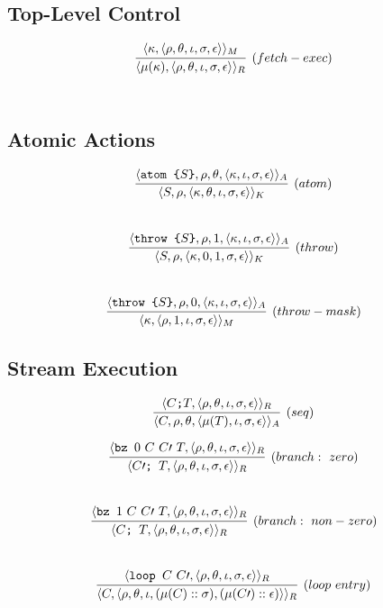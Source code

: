 \documentclass{article}
\newcommand{\state}[1]{\langle #1 \rangle}
\begin{document}
\subsection{Top-Level Control}
\[
  \infer[(fetch-exec)]{\state{\mu(\kappa), \state{\rho, \theta, \iota, \sigma, \epsilon}}_R}{\state{\kappa, \state{\rho, \theta, \iota, \sigma, \epsilon}}_M}
\]
\\

\subsection{Atomic Actions}

\[
  \infer[(atom)]{\state{S, \rho, \state{\kappa, \theta, \iota, \sigma, \epsilon}}_K}{\state{\texttt{atom \{}S\texttt{\}}, \rho, \theta, \state{\kappa, \iota, \sigma, \epsilon}}_A}
\]
\\

\[
  \infer[(throw)]{\state{S, \rho, \state{\kappa, 0, 1, \sigma, \epsilon}}_K}{\state{\texttt{throw \{}S\texttt{\}}, \rho, 1, \state{\kappa, \iota, \sigma, \epsilon}}_A}
\]
\\

\[
  \infer[(throw-mask)]{\state{\kappa, \state{\rho, 1, \iota, \sigma, \epsilon}}_M}{\state{\texttt{throw \{}S\texttt{\}}, \rho, 0, \state{\kappa, \iota, \sigma, \epsilon}}_A}
\]

\subsection{Stream Execution}
\[
  \infer[(seq)]{\state{C, \rho, \theta, \state{\mu(T), \iota, \sigma, \epsilon}}_A}{\state{C\texttt{;}T, \state{\rho, \theta, \iota, \sigma, \epsilon}}_R}
\]

\[
  \infer[(branch:\ zero)]{\state{C\prime\texttt{; }T, \state{\rho, \theta, \iota, \sigma, \epsilon}}_R}{\state{\texttt{bz } 0\ C\ C\prime\ T, \state{\rho, \theta, \iota, \sigma, \epsilon}}_R}
\]
\\
\[
  \infer[(branch:\ non-zero)]{\state{C\texttt{; }T, \state{\rho, \theta, \iota, \sigma, \epsilon}}_R}{\state{\texttt{bz } 1\ C\ C\prime\ T, \state{\rho, \theta, \iota, \sigma, \epsilon}}_R}
\]
\\

\[
  \infer[(loop\ entry)]{\state{C, \state{\rho, \theta, \iota, (\mu(C) :: \sigma), (\mu(C\prime) :: \epsilon)}}_R}{\state{\texttt{loop }C\ C\prime, \state{\rho, \theta, \iota, \sigma, \epsilon}}_R}
\]
\\
\end{document}
